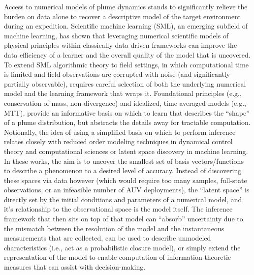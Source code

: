 Access to numerical models of plume dynamics stands to significantly relieve the burden on data alone to recover a descriptive model of the target environment during an expedition.
Scientific machine learning (SML), an emerging subfield of machine learning, has shown that leveraging numerical scientific models of physical principles within classically data-driven frameworks\autocite{raissi2019physics, sapsis2009dynamically, mohan2019compressed,raissi2018numerical,kulkarni2019advection, brunton2016discovering,jiahao2021knowledge} can improve the data efficiency of a learner and the overall quality of the model that is uncovered.
To extend SML algorithmic theory to field settings, in which computational time is limited and field observations are corrupted with noise (and significantly partially observable), requires careful selection of both the underlying numerical model and the learning framework that wraps it.
Foundational principles (e.g., conservation of mass, non-divergence) and idealized, time averaged models (e.g., MTT\autocite{morton1956turbulent}), provide an informative basis on which to learn that describes the ``shape'' of a plume distribution, but abstracts the details away for tractable computation.
Notionally, the idea of using a simplified basis on which to perform inference relates closely with reduced order modeling techniques in dynamical control theory and computational sciences\autocite{lucia2004reduced,burkardt2006pod,salam2019adaptive} or latent space discovery in machine learning\autocite{voynov2020unsupervised,lu2020extracting}.
In these works, the aim is to uncover the smallest set of basis vectors/functions to describe a phenomenon to a desired level of accuracy.
Instead of discovering these spaces via data however (which would require too many samples, full-state observations, or an infeasible number of AUV deployments), the ``latent space'' is directly set by the initial conditions and parameters of a numerical model, and it's relationship to the observational space is the model itself.
The inference framework that then sits on top of that model can ``absorb'' uncertainty due to the mismatch between the resolution of the model and the instantaneous measurements that are collected, can be used to describe unmodeled characteristics (i.e., act as a probabilistic closure model), or simply extend the representation of the model to enable computation of information-theoretic measures that can assist with decision-making.



